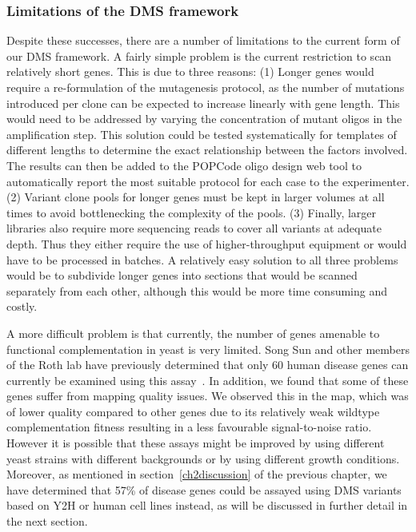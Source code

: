 \subsubsection{Limitations of the DMS framework}
Despite these successes, there are a number of limitations to the current form of our DMS framework. A fairly simple problem is the current restriction to scan relatively short genes. This is due to three reasons: (1) Longer genes would require a re-formulation of the mutagenesis protocol, as the number of mutations introduced per clone can be expected to increase linearly with gene length. This would need to be addressed by varying the concentration of mutant oligos in the amplification step. This solution could be tested systematically for templates of different lengths to determine the exact relationship between the factors involved. The results can then be added to the POPCode oligo design web tool to automatically report the most suitable protocol for each case to the experimenter.
(2) Variant clone pools for longer genes must be kept in larger volumes at all times to avoid bottlenecking the complexity of the pools.
(3) Finally, larger libraries also require more sequencing reads to cover all variants at adequate depth. Thus they either require the use of higher-throughput equipment or would have to be processed in batches. 
A relatively easy solution to all three problems would be to subdivide longer genes into sections that would be scanned separately from each other, although this would be more time consuming and costly.

A more difficult problem is that currently, the number of genes amenable to functional complementation in yeast is very limited. Song Sun and other members of the Roth lab have previously determined that only 60 human disease genes can currently be examined using this assay~\cite{sun_extended_2016}. In addition, we found that some of these genes suffer from mapping quality issues. We observed this in the  map, which was of lower quality compared to other genes due to its relatively weak wildtype complementation fitness resulting in a less favourable signal-to-noise ratio. However it is possible that these assays might be improved by using different yeast strains with different backgrounds or by using different growth conditions.
Moreover, as mentioned in section~\ref{ch2discussion} of the previous chapter, we have determined that 57\% of disease genes could be assayed using DMS variants based on Y2H or human cell lines instead, as will be discussed in further detail in the next section.


